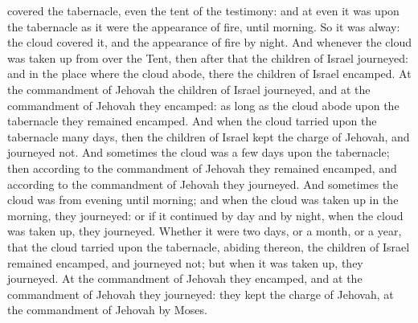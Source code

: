 covered the tabernacle, even the tent of the testimony: and at even it was upon the tabernacle as it were the appearance of fire, until morning. So it was alway: the cloud covered it, and the appearance of fire by night. And whenever the cloud was taken up from over the Tent, then after that the children of Israel journeyed: and in the place where the cloud abode, there the children of Israel encamped. At the commandment of Jehovah the children of Israel journeyed, and at the commandment of Jehovah they encamped: as long as the cloud abode upon the tabernacle they remained encamped. And when the cloud tarried upon the tabernacle many days, then the children of Israel kept the charge of Jehovah, and journeyed not. And sometimes the cloud was a few days upon the tabernacle; then according to the commandment of Jehovah they remained encamped, and according to the commandment of Jehovah they journeyed. And sometimes the cloud was from evening until morning; and when the cloud was taken up in the morning, they journeyed: or if it continued by day and by night, when the cloud was taken up, they journeyed. Whether it were two days, or a month, or a year, that the cloud tarried upon the tabernacle, abiding thereon, the children of Israel remained encamped, and journeyed not; but when it was taken up, they journeyed. At the commandment of Jehovah they encamped, and at the commandment of Jehovah they journeyed: they kept the charge of Jehovah, at the commandment of Jehovah by Moses. 

